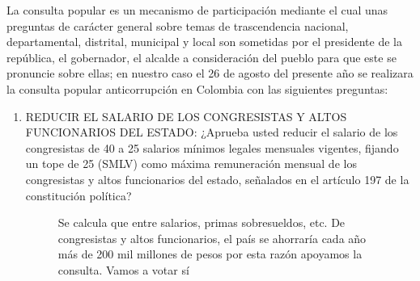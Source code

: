 \documentclass[twoside]{article}
\begin{document}
La consulta popular es un mecanismo de participación mediante el cual unas preguntas de carácter general sobre temas de trascendencia nacional, departamental, distrital, municipal y local son sometidas por el presidente de la república, el gobernador, el alcalde a consideración del pueblo para que este se pronuncie sobre ellas; en nuestro caso el 26 de agosto del presente año se realizara la consulta popular anticorrupción en Colombia con las siguientes preguntas:
\begin{enumerate}
\item REDUCIR EL SALARIO DE LOS CONGRESISTAS Y ALTOS FUNCIONARIOS DEL ESTADO: ¿Aprueba usted reducir el salario de los congresistas de 40 a 25 salarios mínimos legales mensuales vigentes, fijando un tope de 25 (SMLV) como máxima remuneración mensual de los congresistas y altos funcionarios del estado, señalados en el artículo 197 de la constitución política?
    \begin{figure}
    \vspace{-15pt}
\begin{shaded}
  Se calcula que entre salarios, primas sobresueldos, etc. De congresistas y altos funcionarios, el país se ahorraría cada año más de 200 mil millones de pesos por esta razón apoyamos la consulta. Vamos a votar sí
  \end{shaded}
\end{figure}
\end{enumerate}
\end{document}
